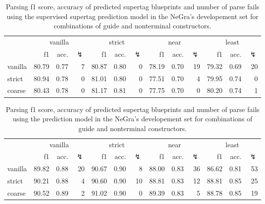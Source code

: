 \documentclass[../../document.tex]{subfiles}
\begin{document}
    \begin{table}
        \caption{\label{tbl:gridsearch:1:2}
            Parsing f1 score, accuracy of predicted supertag blueprints and number of parse fails using the supervised supertag prediction model in the NeGra's developement set for combinations of guide and nonterminal constructors.
        }
        \centering
        \vspace{.2cm}
        \begin{tabular}{l|rrr|rrr|rrr|rrr}
            \toprule
                        & \multicolumn{3}{c|}{vanilla} & \multicolumn{3}{c|}{strict} & \multicolumn{3}{c|}{near} & \multicolumn{3}{c}{least}  \\
                        & f1 & acc. & $\lightning$ & f1 & acc. & $\lightning$ & f1 & acc. & $\lightning$ & f1 & acc. & $\lightning$  \\ \hline
            vanilla     & 80.79 & 0.77 & 7 & 80.87 & 0.80 & 0 & 78.19 & 0.70 & 19 & 79.32 & 0.69 & 20 \\
            strict      & 80.94 & 0.78 & 0 & 81.01 & 0.80 & 0 & 77.51 & 0.70 & 4 & 79.95 & 0.74 & 0 \\
            coarse      & 80.43 & 0.78 & 0 & 81.17 & 0.81 & 0 & 77.75 & 0.70 & 0 & 80.20 & 0.74 & 1 \\
            \bottomrule
        \end{tabular}
    \end{table}
    
    
    \begin{table}
        \caption{\label{tbl:gridsearch:1:3}
            Parsing f1 score, accuracy of predicted supertag blueprints and number of parse fails using the  prediction model in the NeGra's developement set for combinations of guide and nonterminal constructors.
        }
        \centering
        \vspace{.2cm}
        \begin{tabular}{l|rrr|rrr|rrr|rrr}
            \toprule
                        & \multicolumn{3}{c|}{vanilla} & \multicolumn{3}{c|}{strict} & \multicolumn{3}{c|}{near} & \multicolumn{3}{c}{least}  \\
                        & f1 & acc. & $\lightning$ & f1 & acc. & $\lightning$ & f1 & acc. & $\lightning$ & f1 & acc. & $\lightning$  \\ \hline
            vanilla     & 89.82 & 0.88 & 20 & 90.67 & 0.90 & 8 & 88.00 & 0.83 & 36 & 86.62 & 0.81 & 53 \\
            strict      & 90.21 & 0.88 & 4 & 90.60 & 0.90 & 10 & 88.81 & 0.83 & 12 & 88.81 & 0.85 & 25 \\
            coarse      & 90.52 & 0.89 & 2 & 91.02 & 0.90 & 0 & 89.39 & 0.83 & 5 & 88.78 & 0.85 & 19 \\
            \bottomrule
        \end{tabular}
    \end{table}
    
\end{document}
